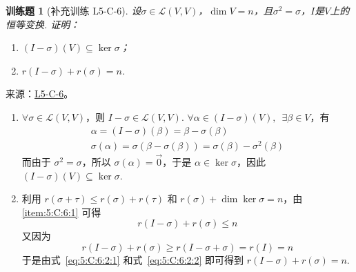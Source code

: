 \documentclass[UTF8,12pt,a4paper,fontset=fandol]{ctexart}
\newtheorem{exercise}{训练题}[section]
\begin{document}
\begin{exercise}[补充训练 L5-C-6]\label{prob:L5-C-6}
设$\sigma\in \mathcal{L}(V,V)$，$\dim V=n$，且$\sigma^2=\sigma$，$I$是$V$上的恒等变换. 证明：
        \begin{enumerate}
            \item $(I-\sigma)(V) \subseteq \ker\sigma$；

            \item $r(I-\sigma)+r(\sigma)=n$.
        \end{enumerate}
\end{exercise}
\noindent 来源：\href{https://github.com/yhwu-is/Linear-Algebra-Left-Undone/blob/new/%E8%AE%B2%E4%B9%89/%E4%B8%93%E9%A2%98/5%20%E7%BA%BF%E6%80%A7%E6%98%A0%E5%B0%84.tex}{L5-C-6}。
\begin{solve}
\begin{enumerate}
                \item \label{item:5:C:6:1}
                      $ \forall \sigma \in \mathcal{L}(V, V) $，则 $ I - \sigma \in \mathcal{L}(V, V) $. $ \forall \alpha \in (I - \sigma)(V),\enspace \exists \beta \in V $，有
                      \begin{gather*}
                          \alpha = (I - \sigma)(\beta) = \beta - \sigma(\beta) \\
                          \sigma(\alpha) = \sigma(\beta - \sigma(\beta)) = \sigma(\beta) - \sigma^2(\beta)
                      \end{gather*}
                      而由于 $ \sigma^2 = \sigma $，所以 $ \sigma(\alpha) = \vec{0} $，于是 $ \alpha \in \ker \sigma $，因此 $ (I - \sigma)(V) \subseteq \ker \sigma $.

                \item 利用 $ r(\sigma + \tau) \leqslant r(\sigma) + r(\tau) $ 和 $ r(\sigma) + \dim \ker \sigma = n $，由 \eqref{item:5:C:6:1} 可得
                      \begin{equation} \label{eq:5:C:6:2:1}
                          r(I - \sigma) + r(\sigma) \leqslant n
                      \end{equation}
                      又因为
                      \begin{equation} \label{eq:5:C:6:2:2}
                          r(I - \sigma) + r(\sigma) \geqslant r(I - \sigma + \sigma) = r(I) = n
                      \end{equation}
                      于是由式~\eqref{eq:5:C:6:2:1} 和式~\eqref{eq:5:C:6:2:2} 即可得到 $ r(I - \sigma) + r(\sigma) = n $.
            \end{enumerate}
\end{solve}
\end{document}
